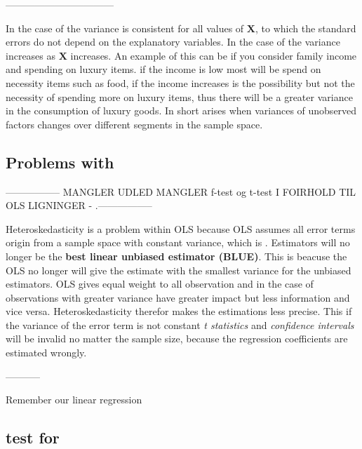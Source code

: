 ---------------------------------

In the case of \homo the variance is consistent for all values of $\textbf{X}$, to which the standard errors do not depend on the explanatory variables. In the case of \hetero the variance increases as $\textbf{X}$ increases. An example of this can be if you consider family income and spending on luxury items. if the income is low most will be spend on necessity items such as food, if the income increases is the possibility but not the necessity of spending more on luxury items, thus there will be a greater variance in the consumption of luxury goods. In short \hetero arises when variances of unobserved factors changes over different segments in the sample space. 



\subsection{Problems with \hetero}


-----------------
MANGLER UDLED MANGLER f-test og t-test I FOIRHOLD TIL OLS LIGNINGER
- .-----------------


Heteroskedasticity is a problem within OLS because OLS assumes all error terms origin from a sample space with constant variance, which is \homo. Estimators will no longer be the \textbf{best linear unbiased estimator (BLUE)}. This is beacuse the OLS no longer will give the estimate with the smallest variance for the unbiased estimators. OLS gives equal weight to all observation and in the case of \hetero observations with greater variance have greater impact but less information and vice versa. Heteroskedasticity therefor makes the estimations less precise. This if the variance of the error term is not constant \textit{t statistics} and \textit{confidence intervals} will be invalid no matter the sample size, because the regression coefficients are estimated wrongly.

-----------

Remember our linear regression




























\subsection{test for \hetero}






